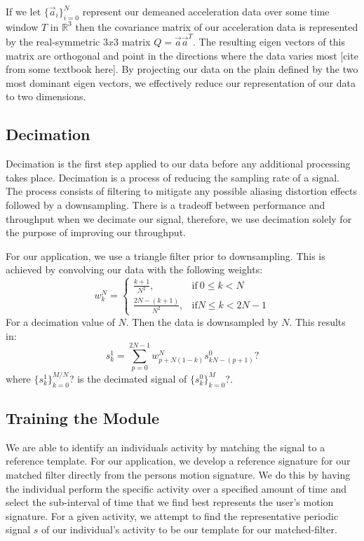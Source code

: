 \documentclass[journal]{IEEEtran}
\begin{document}
If we let $\{\vec{a}_i\}_{i=0}^{N}$ represent our demeaned acceleration data over some time window $T$ in $\mathbb{R}^3$ then the covariance matrix of our acceleration data is represented by the real-symmetric $3x3$ matrix $Q = \vec{a} \vec{a}^T$.
The resulting eigen vectors of this matrix are orthogonal and point in the directions where the data varies most [cite from some textbook here].
By projecting our data on the plain defined by the two most dominant eigen vectors, we effectively reduce our representation of our data to two dimensions.
%
\subsection{Decimation}
Decimation is the first step applied to our data before any additional processing takes place.
Decimation is a process of reducing the sampling rate of a signal.
The process consists of filtering to mitigate any possible aliasing distortion effects followed by a downsampling.
There is a tradeoff between performance and throughput when we decimate our signal, therefore, we use decimation solely for the purpose of improving our throughput.

For our application, we use a triangle filter prior to downsampling. This is achieved by convolving our data with the following weights:
%
\begin{equation} \label{trignal_filter_weights}
w_k^N =
\begin{cases}
  \frac{k+1}{N^2}, & \text{if}\ 0 \leq k < N \\
  \frac{2N - (k + 1)}{N^2}, & \text{if} N \leq k < 2N - 1
\end{cases}
\end{equation}
%
For a decimation value of $N$. Then the data is downsampled by $N$. This results in:
%
\begin{equation} \label{decimated_signal}
s_k^1 = \sum_{p=0}^{2N-1} w_{p+N(1-k)}^N s_{kN - (p+1)}^0 ?
\end{equation}
%
where $\{s_k^1\}_{k=0}^{M/N}$? is the decimated signal of $\{s_k^0\}_{k=0}^M$?.
\subsection{Training the Module}
We are able to identify an individual\textquotesingle s activity by matching the signal to a reference template.
For our application, we develop a reference signature for our matched filter directly from the person\textquotesingle s motion signature.
We do this by having the individual perform the specific activity over a specified amount of time and select the sub-interval of time that we find best represents the user's motion signature.
For a given activity, we attempt to find the representative periodic signal $s$ of our individual’s activity to be our template for our matched-filter.
\end{document}
